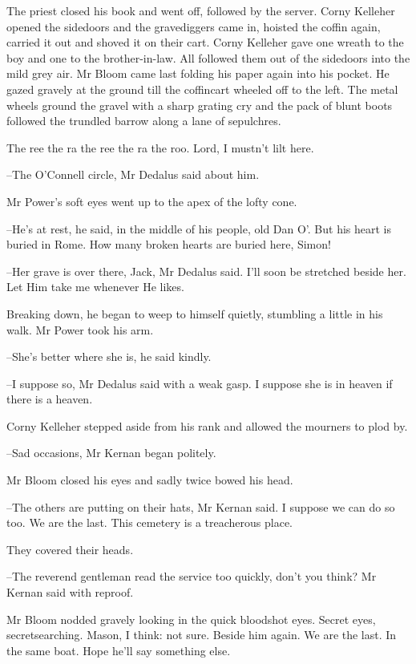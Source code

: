 The priest closed his book and went off, followed by the server.
Corny Kelleher opened the sidedoors and the gravediggers came in,
hoisted the coffin again, carried it out and shoved it on their cart.
Corny Kelleher gave one wreath to the boy and one to the brother-in-law.
All followed them out of the sidedoors into the mild grey air.
Mr Bloom came last
folding his paper again into his pocket.
He gazed gravely at the ground
till the coffincart wheeled off to the left.
The metal wheels ground the gravel
with a sharp grating cry
and the pack of blunt boots followed the trundled barrow
along a lane of sepulchres.

The ree the ra the ree the ra the roo.
Lord, I mustn't lilt here.

--The O'Connell circle,
Mr Dedalus said about him.

Mr Power's soft eyes went up to the apex of the lofty cone.

--He's at rest,
he said,
in the middle of his people, old Dan O'.
But his heart is buried in Rome.
How many broken hearts are buried here, Simon!

--Her grave is over there, Jack,
Mr Dedalus said.
I'll soon be stretched beside her.
Let Him take me whenever He likes.

Breaking down, he began to weep to himself quietly,
stumbling a little in his walk.
Mr Power took his arm.

--She's better where she is,
he said kindly.

--I suppose so,
Mr Dedalus said with a weak gasp.
I suppose she is in heaven if there is a heaven.

Corny Kelleher stepped aside from his rank and allowed the mourners to plod by.

--Sad occasions,
Mr Kernan began politely.

Mr Bloom closed his eyes and sadly twice bowed his head.

--The others are putting on their hats,
Mr Kernan said.
I suppose we can do so too.
We are the last.
This cemetery is a treacherous place.

They covered their heads.

--The reverend gentleman read the service too quickly, don't you think?
Mr Kernan said with reproof.

Mr Bloom nodded gravely looking in the quick bloodshot eyes.
Secret eyes, secretsearching.
Mason, I think:
not sure.
Beside him again.
We are the last.
In the same boat.
Hope he'll say something else.

